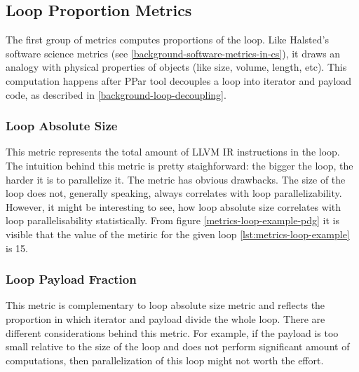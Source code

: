 \subsection{Loop Proportion Metrics}
\label{metrics-loop-proportion-metrics}
\qquad The first group of metrics computes proportions of the loop. Like Halsted's software science metrics (see \ref{background-software-metrics-in-cs}), it draws an analogy with physical properties of objects (like size, volume, length, etc). This computation happens after PPar tool decouples a loop into iterator and payload code, as described in \ref{background-loop-decoupling}.  
\subsubsection{Loop Absolute Size}
\label{metrics-loop-absolute-size}
\qquad This metric represents the total amount of LLVM IR instructions in the loop. The intuition behind this metric is pretty staighforward: the bigger the loop, the harder it is to parallelize it. The metric has obvious drawbacks. The size of the loop does not, generally speaking, always correlates with loop parallelizability. However, it might be interesting to see, how loop absolute size correlates with loop parallelisability statistically. From figure \ref{metrics-loop-example-pdg} it is visible that the value of the metiric for the given loop \ref{lst:metrics-loop-example} is 15.
\subsubsection{Loop Payload Fraction}
\label{metrics-loop-payload-fraction}
\qquad This metric is complementary to loop absolute size metric and reflects the proportion in which iterator and payload divide the whole loop. There are different considerations behind this metric. For example, if the payload is too small relative to the size of the loop and does not perform significant amount of computations, then parallelization of this loop might not worth the effort.   

